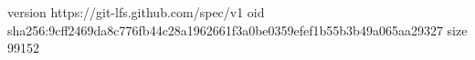 version https://git-lfs.github.com/spec/v1
oid sha256:9cff2469da8c776fb44c28a1962661f3a0be0359efef1b55b3b49a065aa29327
size 99152
